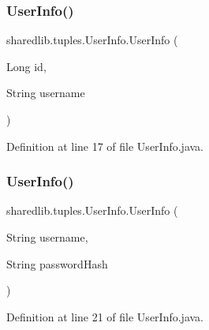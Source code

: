 \subsubsection{\texorpdfstring{User\+Info()}{UserInfo()}\hspace{0.1cm}{\footnotesize\ttfamily [1/3]}}
{\footnotesize\ttfamily sharedlib.\+tuples.\+User\+Info.\+User\+Info (\begin{DoxyParamCaption}\item[{Long}]{id,  }\item[{String}]{username }\end{DoxyParamCaption})}



Definition at line 17 of file User\+Info.\+java.

\hypertarget{classsharedlib_1_1tuples_1_1_user_info_a1c4c22e7bcb44e71b4f096a99cb8586b}{}\label{classsharedlib_1_1tuples_1_1_user_info_a1c4c22e7bcb44e71b4f096a99cb8586b} 
\subsubsection{\texorpdfstring{User\+Info()}{UserInfo()}\hspace{0.1cm}{\footnotesize\ttfamily [2/3]}}
{\footnotesize\ttfamily sharedlib.\+tuples.\+User\+Info.\+User\+Info (\begin{DoxyParamCaption}\item[{String}]{username,  }\item[{String}]{password\+Hash }\end{DoxyParamCaption})}



Definition at line 21 of file User\+Info.\+java.

\hypertarget{classsharedlib_1_1tuples_1_1_user_info_aa67b1ad5c5fef64f0ae7a8a459a3cec9}{}\label{classsharedlib_1_1tuples_1_1_user_info_aa67b1ad5c5fef64f0ae7a8a459a3cec9} 
